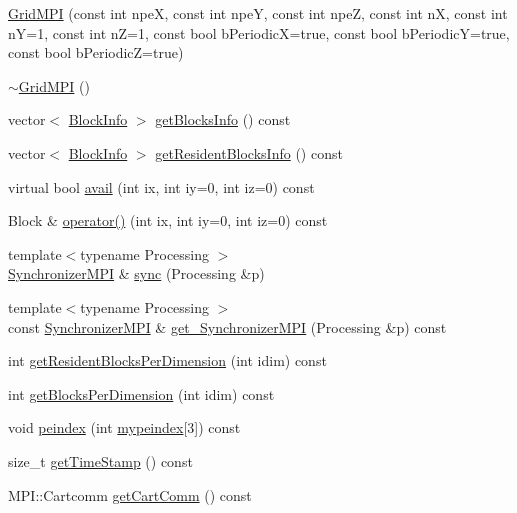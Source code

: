 \begin{DoxyCompactItemize}
\item 
\hyperlink{class_grid_m_p_i_ad515efd9d7bd9560eed5e958950cbb4d}{Grid\+M\+P\+I} (const int npe\+X, const int npe\+Y, const int npe\+Z, const int n\+X, const int n\+Y=1, const int n\+Z=1, const bool b\+Periodic\+X=true, const bool b\+Periodic\+Y=true, const bool b\+Periodic\+Z=true)
\item 
\hyperlink{class_grid_m_p_i_a22874a9873aacbc4813f8f47606c89b6}{$\sim$\+Grid\+M\+P\+I} ()
\item 
vector$<$ \hyperlink{struct_block_info}{Block\+Info} $>$ \hyperlink{class_grid_m_p_i_abd9d87482f590729369816a9191fec90}{get\+Blocks\+Info} () const 
\item 
vector$<$ \hyperlink{struct_block_info}{Block\+Info} $>$ \hyperlink{class_grid_m_p_i_ae68d98fcfc60a139a468b2b66743a815}{get\+Resident\+Blocks\+Info} () const 
\item 
virtual bool \hyperlink{class_grid_m_p_i_a09fb63dc01bf37404fbce026dc52f8da}{avail} (int ix, int iy=0, int iz=0) const 
\item 
Block \& \hyperlink{class_grid_m_p_i_ae21841fb3c6ff3127647610a62388b6d}{operator()} (int ix, int iy=0, int iz=0) const 
\item 
{\footnotesize template$<$typename Processing $>$ }\\\hyperlink{class_synchronizer_m_p_i}{Synchronizer\+M\+P\+I} \& \hyperlink{class_grid_m_p_i_adbd8d6fb9ec2dd16e9a8317fa573d000}{sync} (Processing \&p)
\item 
{\footnotesize template$<$typename Processing $>$ }\\const \hyperlink{class_synchronizer_m_p_i}{Synchronizer\+M\+P\+I} \& \hyperlink{class_grid_m_p_i_ae57bf08859c39ed4ea3ee3031b289352}{get\+\_\+\+Synchronizer\+M\+P\+I} (Processing \&p) const 
\item 
int \hyperlink{class_grid_m_p_i_a2d743c8605ca373df9f174b350c06d76}{get\+Resident\+Blocks\+Per\+Dimension} (int idim) const 
\item 
int \hyperlink{class_grid_m_p_i_aad5685d311020dd70b9af3b08f51450f}{get\+Blocks\+Per\+Dimension} (int idim) const 
\item 
void \hyperlink{class_grid_m_p_i_afc77b34860081db4e179c6bd5ec4a04c}{peindex} (int \hyperlink{class_grid_m_p_i_a18aa2c80d121cc50339949d8c3d0d547}{mypeindex}\mbox{[}3\mbox{]}) const 
\item 
size\+\_\+t \hyperlink{class_grid_m_p_i_a225c750fb4e70ed908fb8ec485b31762}{get\+Time\+Stamp} () const 
\item 
M\+P\+I\+::\+Cartcomm \hyperlink{class_grid_m_p_i_a0368859fa3e4d49b1a6a52daa5789712}{get\+Cart\+Comm} () const 
\end{DoxyCompactItemize}
